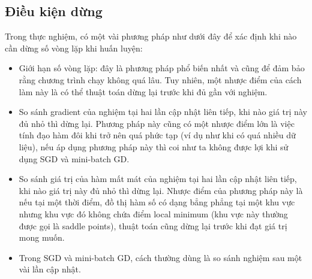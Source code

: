 \subsection{Điều kiện dừng}
Trong thực nghiệm, có một vài phương pháp như dưới đây để xác định khi nào cần dừng số vòng lặp khi huấn luyện:
\begin{itemize}
\item Giới hạn số vòng lặp: đây là phương pháp phổ biến nhất và cũng để đảm bảo rằng chương trình chạy không quá lâu. Tuy nhiên, một nhược điểm của cách làm này là có thể thuật toán dừng lại trước khi đủ gần với nghiệm.
\item So sánh gradient của nghiệm tại hai lần cập nhật liên tiếp, khi nào giá trị này đủ nhỏ thì dừng lại. Phương pháp này cũng có một nhược điểm lớn là việc tính đạo hàm đôi khi trở nên quá phức tạp (ví dụ như khi có quá nhiều dữ liệu), nếu áp dụng phương pháp này thì coi như ta không được lợi khi sử dụng SGD và mini-batch GD.
\item So sánh giá trị của hàm mất mát của nghiệm tại hai lần cập nhật liên tiếp, khi nào giá trị này đủ nhỏ thì dừng lại. Nhược điểm của phương pháp này là nếu tại một thời điểm, đồ thị hàm số có dạng bẳng phẳng tại một khu vực nhưng khu vực đó không chứa điểm local minimum (khu vực này thường được gọi là saddle points), thuật toán cũng dừng lại trước khi đạt giá trị mong muốn.
\item Trong SGD và mini-batch GD, cách thường dùng là so sánh nghiệm sau một vài lần cập nhật.
\end{itemize}


